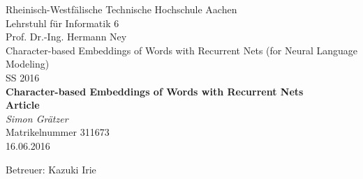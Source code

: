 \documentclass[twoside,11pt,a4paper]{article}
\theoremstyle{break}
\begin{document}


%
%
%
%
\pagestyle{empty}

\begin{center}

    Rheinisch-Westf\"alische Technische Hochschule Aachen \\
    Lehrstuhl f\"ur Informatik 6 \\
    Prof. Dr.-Ing. Hermann Ney\\[6ex]
    Character-based Embeddings of Words with Recurrent Nets (for Neural Language Modeling)\\[12ex]  %
    SS 2016\\[6ex]
   
    \LARGE
    \textbf{Character-based Embeddings of Words with Recurrent Nets} \\[6ex]
    \textbf{Article} \\[6ex] %
    \textit{Simon Gr\"atzer} \\[6ex]
    \Large
    Matrikelnummer 311673 \\[6ex]
    16.06.2016

    \vfill
    \Large Betreuer: Kazuki Irie
	    
\end{center}
\end{document}
